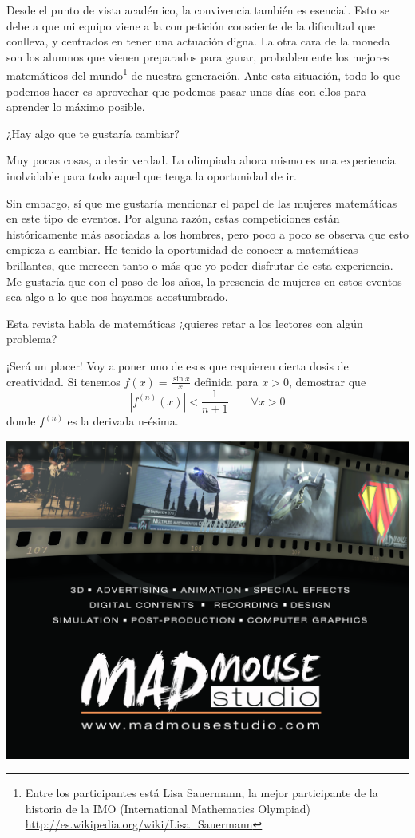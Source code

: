 Desde el punto de vista académico, la convivencia también es esencial. Esto se debe a que mi equipo viene a la competición consciente de la dificultad que conlleva, y centrados en tener una actuación digna. La otra cara de la moneda son los alumnos que vienen preparados para ganar, probablemente los mejores matemáticos del mundo\footnote{Entre los participantes está Lisa Sauermann, la mejor participante de la historia de la IMO (International Mathematics Olympiad) \url{http://es.wikipedia.org/wiki/Lisa_Sauermann}} de nuestra generación. Ante esta situación, todo lo que podemos hacer es aprovechar que podemos pasar unos días con ellos para aprender lo máximo posible.


\begin{pregunta}
  ¿Hay algo que te gustaría cambiar?
\end{pregunta}
Muy pocas cosas, a decir verdad. La olimpiada ahora mismo es una experiencia inolvidable para todo aquel que tenga la oportunidad de ir.

Sin embargo, sí que me gustaría mencionar el papel de las mujeres matemáticas en este tipo de eventos. Por alguna razón, estas competiciones están históricamente más asociadas a los hombres, pero poco a poco se observa que esto empieza a cambiar. He tenido la oportunidad de conocer a matemáticas brillantes, que merecen tanto o más que yo poder disfrutar de esta experiencia. Me gustaría que con el paso de los años, la presencia de mujeres en estos eventos sea algo a lo que nos hayamos acostumbrado.


\begin{pregunta}
  Esta revista habla de matemáticas ¿quieres retar a los lectores con algún problema?
\end{pregunta}
¡Será un placer! Voy a poner uno de esos que requieren cierta dosis de creatividad. Si tenemos $f(x)=\frac{\sin x}{x}$ definida para $x>0$, demostrar que
\begin{equation*}
  |f^{(n)}(x)| < \frac{1}{n+1}\qquad \forall x>0
\end{equation*}
donde $f^{(n)}$ es la derivada n-ésima.

\vspace{1cm}
\centering
\includegraphics[scale=0.8]{pubmm.png}
\newpage



